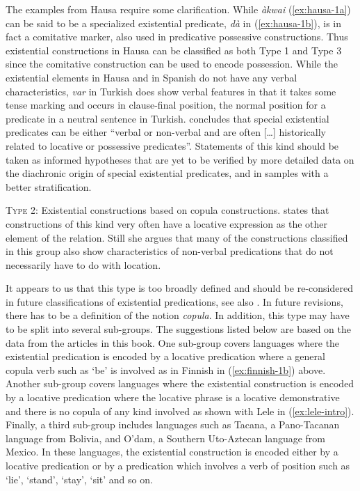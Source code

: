 \documentclass[output=paper,chinesefont,colorlinks,citecolor=brown]{langscibook}
\begin{document}
The examples from Hausa require some clarification. While \textit{àkwai} (\ref{ex:hausa-1a}) can be said to be a specialized existential predicate, \textit{dà} in (\ref{ex:hausa-1b}), is in fact a comitative marker, also used in predicative possessive constructions. Thus existential constructions in Hausa can be classified as both Type 1 and Type 3 since the comitative construction can be used to encode possession. While the existential elements in Hausa and in Spanish do not have any verbal characteristics, \textit{var} in Turkish does show verbal features in that it takes some tense marking and occurs in clause-final position, the normal position for a predicate in a neutral sentence in Turkish. \citet[215]{McNally2016} concludes that special existential predicates can be either “verbal or non-verbal and are often […] historically related to locative or possessive predicates”. Statements of this kind should be taken as informed hypotheses that are yet to be verified by more detailed data on the diachronic origin of special existential predicates, and in samples with a better stratification. 

\textsc{Type 2}:	Existential constructions based on copula constructions. \citet[215]{McNally2016} states that constructions of this kind very often have a locative expression as the other element of the relation. Still she argues that many of the constructions classified in this group also show characteristics of non-verbal predications that do not necessarily have to do with location. 

It appears to us that this type is too broadly defined and should be re-considered in future classifications of existential predications, see also \citep{creissels2019}. In future revisions, there has to be a definition of the notion \textit{copula}. In addition, this type may have to be split into several sub-groups. The suggestions listed below are based on the data from the articles in this book. One sub-group covers languages where the existential predication is encoded by a locative predication where a general copula verb such as ‘be’ is involved as in Finnish in (\ref{ex:finnish-1b}) above. Another sub-group covers languages where the existential construction is encoded by a locative predication where the locative phrase is a locative demonstrative and there is no copula of any kind involved as shown with Lele in (\ref{ex:lele-intro}). Finally, a third sub-group includes languages such as Tacana, a Pano-Tacanan language from Bolivia, and O’dam, a Southern Uto-Aztecan language from Mexico. In these languages, the existential construction is encoded either by a locative predication or by a predication which involves a verb of position such as ‘lie’, ‘stand’, ‘stay’, ‘sit’ and so on.
\end{document}
